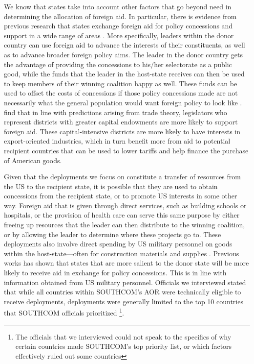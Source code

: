 \documentclass[12pt]{article}
\begin{document}
\begin{doublespace}
We know that states take into account other factors that go beyond need in determining the allocation of foreign aid. In particular, there is evidence from previous research that states exchange foreign aid for policy concessions and support in a wide range of areas \cite{LaiMorey2006,de2007foreign,Faye12,MilnerTingley2010,FleckKilby2006}. More specifically, leaders within the donor country can use foreign aid to advance the interests of their constituents, as well as to advance broader foreign policy aims. The leader in the donor country gets the advantage of providing the concessions to his/her selectorate as a public good, while the funds that the leader in the host-state receives can then be used to keep members of their winning coalition happy as well. These funds can be used to offset the costs of concessions if those policy concessions made are not necessarily what the general population would want foreign policy to look like \cite{de2007foreign}.  find that in line with predictions arising from trade theory, legislators who represent districts with greater capital endowments are more likely to support foreign aid. These capital-intensive districts are more likely to have interests in export-oriented industries, which in turn benefit more from aid to potential recipient countries that can be used to lower tariffs and help finance the purchase of American goods.    

Given that the deployments we focus on constitute a transfer of resources from the US to the recipient state, it is possible that they are used to obtain concessions from the recipient state, or to promote US interests in some other way. Foreign aid that is given through direct services, such as building schools or hospitals, or the provision of health care can serve this same purpose by either freeing up resources that the leader can then distribute to the winning coalition, or by allowing the leader to determine where these projects go to. These deployments also involve direct spending by US military personnel on goods within the host-state---often for construction materials and supplies \cite{CPT20160309,SFC20160226}. Previous works has shown that states that are more salient to the donor state will be more likely to receive aid in exchange for policy concessions. This is in line with information obtained from US military personnel. Officials we interviewed stated that while all countries within SOUTHCOM's AOR were technically eligible to receive deployments, deployments were generally limited to the top 10 countries that SOUTHCOM officials prioritized \cite{CPT20160309}\footnote{The officials that we interviewed could not speak to the specifics of why certain countries made SOUTHCOM's top priority list, or which factors effectively ruled out some countries}.  


\end{doublespace}
\end{document}

